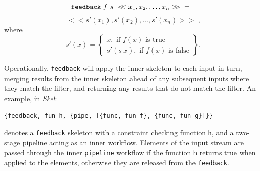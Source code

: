 \documentclass[final]{jfp1}
\newcommand{\fback}[0]{\lstinline{feedback}\xspace}
\newcommand{\stream}[1]{~<\!\!<#1>\!\!>~}
\begin{document}
\begin{itemize}

$$\texttt{feedback}~f~s \stream{x_1,x_2,\dots,x_n} \newline=~~$$
$$\stream{s'(x_1),s'(x_2),\dots,s'(x_n)},$$
where $$s'(x) = \left \{ \begin{array}{l} x, \mbox{ if } f(x) \mbox{ is true} \\ s'(s~x), \mbox{ if } f(x) \mbox{ is false} \end{array} \right \}. $$

Operationally, \texttt{feedback} will apply the inner skeleton to each input in
turn, merging results from the inner skeleton ahead of any subsequent inputs
where they match the filter, and returning any results that do not match the
filter.
An example, in \emph{Skel}:
\begin{lstlisting}
{feedback, fun h, {pipe, [{func, fun f}, {func, fun g}]}}
\end{lstlisting}
denotes a \fback skeleton with a constraint checking function
\lstinline|h|, and a two-stage pipeline acting as an inner workflow. 
Elements of the input stream are passed through the inner \texttt{pipeline}
workflow if the function \lstinline|h| returns true when applied to the elements, otherwise they are released from the \fback.


\end{itemize}

\end{document}

